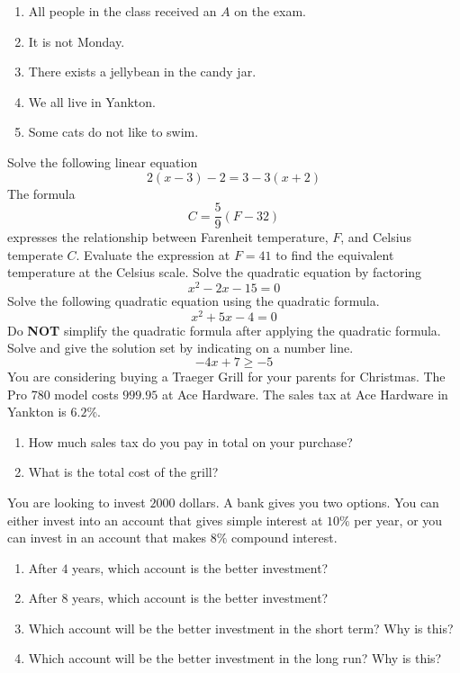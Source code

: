 \documentclass[addpoints,12pt]{exam}
\begin{document}
\begin{questions}
\begin{enumerate}[label = \alph*)]
	\item All people in the class received an $A$ on the exam. 
	\item It is not Monday. 
	\item There exists a jellybean in the candy jar. 
	\item We all live in Yankton. 
	\item Some cats do not like to swim. 
\end{enumerate}
\question Solve the following linear equation 
\[
2(x-3)-2 = 3-3(x+2) 
\]
\question The formula 
\[
C = \frac{5}{9}(F-32)
\]
expresses the relationship between Farenheit temperature, $F$, and Celsius temperate $C$. Evaluate the expression at $F = 41$ to find the equivalent temperature at the Celsius scale. 
\question Solve the quadratic equation by factoring 
\[
x^{2}-2x-15 = 0 
\]
\question Solve the following quadratic equation using the quadratic formula. 
\[
x^{2}+5x - 4 = 0 
\]
Do \textbf{NOT} simplify the quadratic formula after applying the quadratic formula. 
\question Solve and give the solution set by indicating on a number line. 
\[
-4x + 7 \geq -5 
\]
\question  You are considering buying a Traeger Grill for your parents for Christmas. The Pro 780 model costs $999.95$ at Ace Hardware. The sales tax at Ace Hardware in Yankton is $6.2\%$. 
\begin{enumerate}[label = \alph*)]
	\item How much sales tax do you pay in total on your purchase? 
	\item What is the total cost of the grill? 
\end{enumerate}
\question You are looking to invest $2000$ dollars. A bank gives you two options. You can either invest into an account that gives simple interest at $10\%$ per year, or you can invest in an account that makes $8\% $ compound interest. 
\begin{enumerate}[label = \alph*)]
	\item After $4$ years, which account is the better investment? 
	\item After $8$ years, which account is the better investment? 
	\item Which account will be the better investment in the short term? Why is this? 
	\item Which account will be the better investment in the long run? Why is this? 
\end{enumerate}
    
\end{questions}

    
\end{document}
